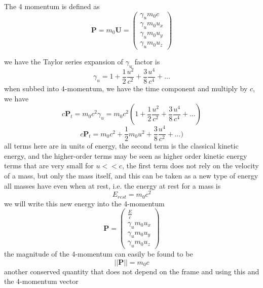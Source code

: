 The 4 momentum is defined as
\begin{equation}
	\mathbf{P} = m_0 \mathbf{U} =
	\begin{pmatrix}
		\gamma_u m_0 c \\ \gamma_u m_0 u_x \\ \gamma_u m_0 u_y \\ \gamma_u m_0 u_z
	\end{pmatrix}
\end{equation}



we have the Taylor series expansion of $\gamma_u$ factor is
\begin{equation}
	\gamma_u = 1 + \frac{1}{2}\frac{u^2}{c^2} + \frac{3}{8}\frac{u^4}{c^4} + ...
\end{equation}
when subbed into 4-momentum, we have the time component and multiply by $c$, we have
\begin{equation}
	c \mathbf{P}_t = m_0 c^2\gamma_u = m_0 c^2 ( 1 + \frac{1}{2}\frac{u^2}{c^2} +\frac{3}{8}\frac{u^4}{c^4} + ... )
\end{equation}
\begin{equation}
	c \mathbf{P}_t = m_0 c^2  + \frac{1}{2} m_0 u^2  + \frac{3}{8}\frac{u^4}{c^2} + ... )
\end{equation}
all terms here are in units of energy, the second term is the classical kinetic energy, and the higher-order terms may be seen as higher order kinetic energy terms that are very small for $u<<c$, the first term does not rely on the velocity of a mass, but only the mass itself, and this can be taken as a new type of energy all masses have even when at rest, i.e. the energy at rest for a mass is
\begin{equation}
	E_{rest} = m_0 c^2
\end{equation}
we will write this new energy into the 4-momentum
\begin{equation}
	\mathbf{P} =
	\begin{pmatrix}
		\frac{E}{c} \\ \gamma_u m_0 u_x \\ \gamma_u m_0 u_y \\ \gamma_u m_0 u_z
	\end{pmatrix}
\end{equation}
the magnitude of the 4-momentum can easily be found to be
\begin{equation}
	||\mathbf{P}|| = m_0 c
\end{equation}
another conserved quantity that does not depend on the frame and using this and the 4-momentum vector
